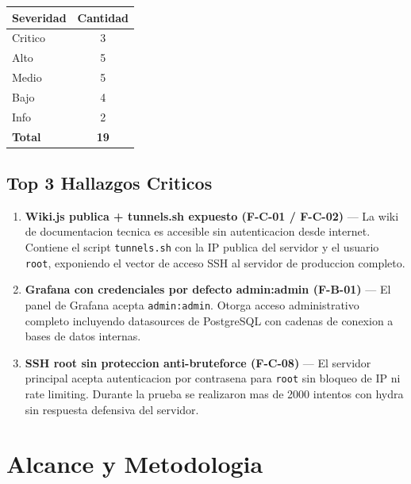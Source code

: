 \documentclass[11pt,a4paper]{article}
\begin{document}
\begin{center}
\begin{tabular}{lc}
\toprule
\textbf{Severidad} & \textbf{Cantidad} \\
\midrule
Critico  & 3 \\
Alto     & 5 \\
Medio    & 5 \\
Bajo     & 4 \\
Info     & 2 \\
\midrule
\textbf{Total} & \textbf{19} \\
\bottomrule
\end{tabular}
\end{center}

\vspace{0.4cm}

\subsection*{Top 3 Hallazgos Criticos}

\begin{enumerate}[leftmargin=*, label=\textbf{\arabic*.}]
  \item \textbf{Wiki.js publica + tunnels.sh expuesto (F-C-01 / F-C-02)} ---
    La wiki de documentacion tecnica es accesible sin autenticacion desde
    internet. Contiene el script \texttt{tunnels.sh} con la IP publica del
    servidor y el usuario \texttt{root}, exponiendo el vector de acceso SSH
    al servidor de produccion completo.

  \item \textbf{Grafana con credenciales por defecto admin:admin (F-B-01)} ---
    El panel de Grafana acepta \texttt{admin:admin}. Otorga acceso administrativo
    completo incluyendo datasources de PostgreSQL con cadenas de conexion
    a bases de datos internas.

  \item \textbf{SSH root sin proteccion anti-bruteforce (F-C-08)} ---
    El servidor principal acepta autenticacion por contrasena para \texttt{root}
    sin bloqueo de IP ni rate limiting. Durante la prueba se realizaron mas
    de 2000 intentos con hydra sin respuesta defensiva del servidor.
\end{enumerate}

\newpage

\section{Alcance y Metodologia}
\end{document}
